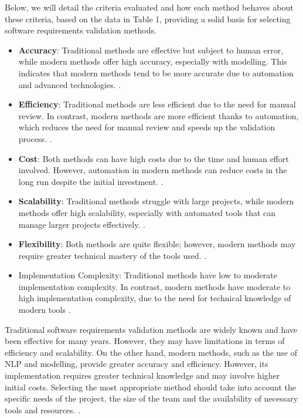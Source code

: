 \sloppy
Below, we will detail the criteria evaluated and how each method behaves about these criteria, based on the data in Table 1, providing a solid basis for selecting software requirements validation methods.
\begin{itemize}
\sloppy
 \item \textbf{Accuracy}: Traditional methods are effective but subject to human error, while modern methods offer high accuracy, especially with modelling. This indicates that modern methods tend to be more accurate due to automation and advanced technologies. \cite{Wiegers2013}.
 \item \textbf{Efficiency}: Traditional methods are less efficient due to the need for manual review. In contrast, modern methods are more efficient thanks to automation, which reduces the need for manual review and speeds up the validation process. \cite{Wiegers2013}.
 \item \textbf{Cost}: Both methods can have high costs due to the time and human effort involved. However, automation in modern methods can reduce costs in the long run despite the initial investment. \cite{Wiegers2013}.
 \item \textbf{Scalability}: Traditional methods struggle with large projects, while modern methods offer high scalability, especially with automated tools that can manage larger projects effectively. \cite{Wiegers2013}.
 \item \textbf{Flexibility}: Both methods are quite flexible; however, modern methods may require greater technical mastery of the tools used. \cite{Wiegers2013}.
 \item Implementation Complexity: Traditional methods have low to moderate implementation complexity. In contrast, modern methods have moderate to high implementation complexity, due to the need for technical knowledge of modern tools \cite{Wiegers2013}.
 \end{itemize}
 \sloppy
 Traditional software requirements validation methods are widely known and have been effective for many years. However, they may have limitations in terms of efficiency and scalability. On the other hand, modern methods, such as the use of NLP and modelling, provide greater accuracy and efficiency. However, its implementation requires greater technical knowledge and may involve higher initial costs. Selecting the most appropriate method should take into account the specific needs of the project, the size of the team and the availability of necessary tools and resources. \cite{Wiegers2013}.

